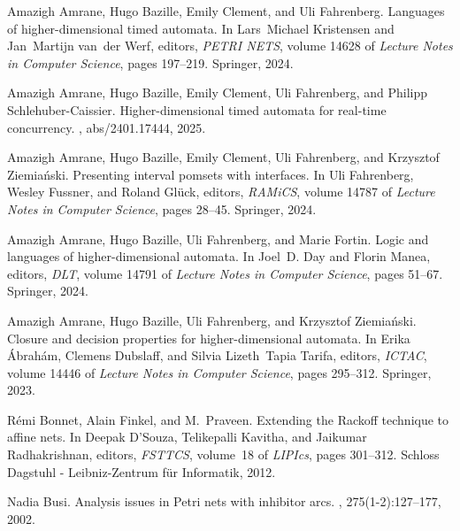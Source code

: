 \documentclass[runningheads,envcountsame]{llncs}
\begin{document}
\newcommand{\Afirst}[1]{#1} \newcommand{\afirst}[1]{#1}
\begin{thebibliography}{10}

Amazigh Amrane, Hugo Bazille, Emily Clement, and Uli Fahrenberg.
\newblock Languages of higher-dimensional timed automata.
\newblock In Lars~Michael Kristensen and Jan~Martijn van~der Werf, editors,
  {\em {PETRI} {NETS}}, volume 14628 of {\em {Lecture Notes in Computer
  Science}}, pages 197--219. {Springer}, 2024.

Amazigh Amrane, Hugo Bazille, Emily Clement, Uli Fahrenberg, and Philipp
  Schlehuber-Caissier.
\newblock Higher-dimensional timed automata for real-time concurrency.
, abs/2401.17444, 2025.

Amazigh Amrane, Hugo Bazille, Emily Clement, Uli Fahrenberg, and Krzysztof
  Ziemia{\'n}ski.
\newblock Presenting interval pomsets with interfaces.
\newblock In Uli Fahrenberg, Wesley Fussner, and Roland Gl{\"u}ck, editors,
  {\em RAMiCS}, volume 14787 of {\em {Lecture Notes in Computer Science}},
  pages 28--45. {Springer}, 2024.

Amazigh Amrane, Hugo Bazille, Uli Fahrenberg, and Marie Fortin.
\newblock Logic and languages of higher-dimensional automata.
\newblock In Joel~D. Day and Florin Manea, editors, {\em DLT}, volume 14791 of
  {\em {Lecture Notes in Computer Science}}, pages 51--67. {Springer}, 2024.

Amazigh Amrane, Hugo Bazille, Uli Fahrenberg, and Krzysztof Ziemia{\'n}ski.
\newblock Closure and decision properties for higher-dimensional automata.
\newblock In Erika {\'{A}}brah{\'{a}}m, Clemens Dubslaff, and Silvia
  Lizeth~Tapia Tarifa, editors, {\em ICTAC}, volume 14446 of {\em {Lecture
  Notes in Computer Science}}, pages 295--312. {Springer}, 2023.

R{\'{e}}mi Bonnet, Alain Finkel, and M.~Praveen.
\newblock Extending the {Rackoff} technique to affine nets.
\newblock In Deepak D'Souza, Telikepalli Kavitha, and Jaikumar Radhakrishnan,
  editors, {\em FSTTCS}, volume~18 of {\em LIPIcs}, pages 301--312. Schloss
  Dagstuhl - Leibniz-Zentrum f{\"{u}}r Informatik, 2012.

Nadia Busi.
\newblock Analysis issues in {Petri} nets with inhibitor arcs.
, 275(1-2):127--177, 2002.


\end{thebibliography}
\end{document}
